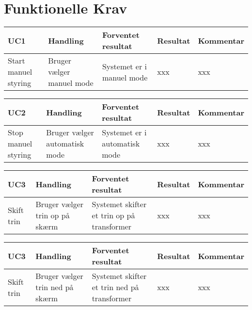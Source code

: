 
\section{Funktionelle Krav}
\begin{table}[htbp]
	\centering
	\begin{tabular}{|p{2cm}|p{3.5cm}|p{4cm}|p{2cm}|p{2.5cm}|}
		\hline
		\textbf{UC1} & \textbf{Handling} & \textbf{Forventet resultat} & \textbf{Resultat} &\textbf{Kommentar} \\\hline
		Start manuel styring & Bruger vælger manuel mode & Systemet er i manuel mode & xxx & xxx \\\hline
		
		
	\end{tabular}

	
\end{table}

\begin{table}[htbp]
	\centering
	\begin{tabular}{|p{2cm}|p{3.5cm}|p{4cm}|p{2cm}|p{2.5cm}|}
		\hline
		\textbf{UC2} & \textbf{Handling} & \textbf{Forventet resultat} & \textbf{Resultat} &\textbf{Kommentar} \\\hline
		Stop manuel styring & Bruger vælger automatisk mode & Systemet er i automatisk mode & xxx & xxx \\\hline	
	\end{tabular}
\end{table}

\begin{table}[htbp]
	\centering
	\begin{tabular}{|p{2cm}|p{3.5cm}|p{4cm}|p{2cm}|p{2.5cm}|}
		\hline
		\textbf{UC3} & \textbf{Handling} & \textbf{Forventet resultat} & \textbf{Resultat} &\textbf{Kommentar} \\\hline
		Skift trin & Bruger vælger trin op på skærm & Systemet skifter et trin op på transformer & xxx & xxx \\\hline
	\end{tabular}
\end{table}

\begin{table}[htbp]
	\centering
	\begin{tabular}{|p{2cm}|p{3.5cm}|p{4cm}|p{2cm}|p{2.5cm}|}
		\hline
		\textbf{UC3} & \textbf{Handling} & \textbf{Forventet resultat} & \textbf{Resultat} &\textbf{Kommentar} \\\hline
		Skift trin & Bruger vælger trin ned på skærm & Systemet skifter et trin ned på transformer & xxx & xxx \\\hline
	\end{tabular}
\end{table}